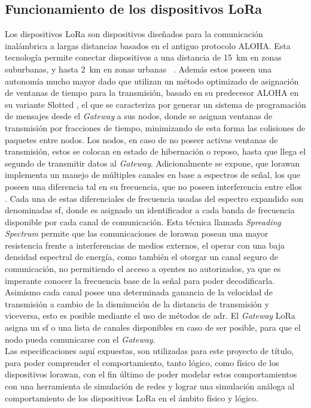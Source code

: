 \begin{justify}
\section{Funcionamiento de los dispositivos LoRa}
Los dispositivos LoRa son dispositivos diseñados para la comunicación inalámbrica a largas distancias basados en el antiguo protocolo ALOHA. Esta tecnología permite conectar dispositivos a una distancia de \SI{15}{\kilo\meter} en zonas suburbanas, y hasta \SI{2}{\kilo\meter} en zonas urbanas \cite{Sornin}~\cite{Sornin2}. Además estos poseen una autonomía mucho mayor dado que utilizan un método optimizado de asignación de ventanas de tiempo para la transmisión, basado en su predecesor ALOHA en su variante Slotted \cite{NORMAN}, el que se caracteriza por generar un sistema de programación de mensajes desde el \textit{Gateway} a sus nodos, donde se asignan ventanas de transmisión por fracciones de tiempo, minimizando de esta forma las colisiones de paquetes entre nodos. Los nodos, en caso de no poseer activas ventanas de transmisión, estos se colocan en estado de hibernación o reposo, hasta que llega el segundo de transmitir datos al \textit{Gateway}. Adicionalmente se expone, que \gls{lorawan} implementa un manejo de múltiples canales en base a espectros de señal, los que poseen una diferencia tal en su frecuencia, que no poseen interferencia entre ellos \cite{modulation}. Cada una de estas diferenciales de frecuencia usadas del espectro expandido son denominadas \gls{sf}, donde es asignado un identificador a cada banda de frecuencia disponible por cada canal de comunicación. Esta técnica llamada \textit{Spreading Spectrum} permite que las comunicaciones de \gls{lorawan} posean una mayor resistencia frente a interferencias de medios externos, el operar con una baja densidad espectral de energía, como también el otorgar un canal seguro de comunicación, no permitiendo el acceso a oyentes no autorizados, ya que es imperante conocer la frecuencia base de la señal para poder decodificarla. Asimismo cada canal posee una determinada ganancia de la velocidad de transmisión a cambio de la disminución de la distancia de transmisión y viceversa, esto es posible mediante el uso de métodos de \gls{adr}. El \textit{Gateway} LoRa asigna un \gls{sf} o una lista de canales disponibles en caso de ser posible, para que el nodo pueda comunicarse con el \textit{Gateway}.\\
Las especificaciones aquí expuestas, son utilizadas para este proyecto de título, para poder comprender el comportamiento, tanto lógico, como físico de los dispositivos \gls{lorawan}, con el fin último de poder modelar estos comportamientos con una herramienta de simulación de redes y lograr una simulación análoga al comportamiento de los dispositivos LoRa en el ámbito físico y lógico.


\end{justify}
